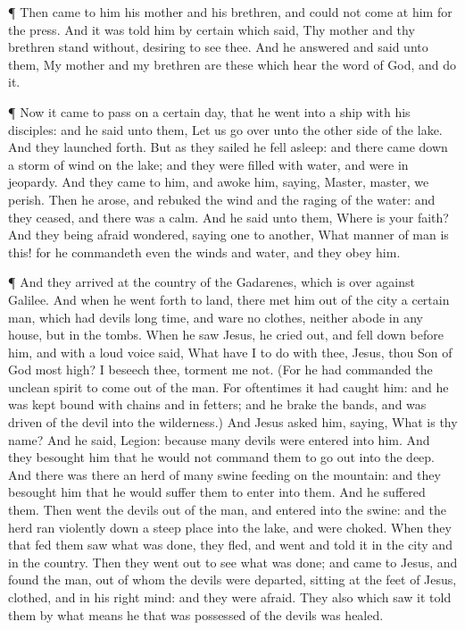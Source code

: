  ¶ Then came to him his mother and his brethren, and could
not come at him for the press.  And it was told him by
certain which said, Thy mother and thy brethren stand without, desiring
to see thee.  And he answered and said unto them, My mother
and my brethren are these which hear the word of God, and do it.

 ¶ Now it came to pass on a certain day, that he went into
a ship with his disciples: and he said unto them, Let us go over unto
the other side of the lake. And they launched forth.  But
as they sailed he fell asleep: and there came down a storm of wind on
the lake; and they were filled with water, and were in jeopardy.
 And they came to him, and awoke him, saying, Master,
master, we perish. Then he arose, and rebuked the wind and the raging of
the water: and they ceased, and there was a calm.  And he
said unto them, Where is your faith? And they being afraid wondered,
saying one to another, What manner of man is this! for he commandeth
even the winds and water, and they obey him.

 ¶ And they arrived at the country of the Gadarenes, which
is over against Galilee.  And when he went forth to land,
there met him out of the city a certain man, which had devils long time,
and ware no clothes, neither abode in any house, but in the tombs.
 When he saw Jesus, he cried out, and fell down before him,
and with a loud voice said, What have I to do with thee, Jesus, thou Son
of God most high? I beseech thee, torment me not.  (For he
had commanded the unclean spirit to come out of the man. For oftentimes
it had caught him: and he was kept bound with chains and in fetters; and
he brake the bands, and was driven of the devil into the wilderness.)
 And Jesus asked him, saying, What is thy name? And he
said, Legion: because many devils were entered into him. 
And they besought him that he would not command them to go out into the
deep.  And there was there an herd of many swine feeding on
the mountain: and they besought him that he would suffer them to enter
into them. And he suffered them.  Then went the devils out
of the man, and entered into the swine: and the herd ran violently down
a steep place into the lake, and were choked.  When they
that fed them saw what was done, they fled, and went and told it in the
city and in the country.  Then they went out to see what
was done; and came to Jesus, and found the man, out of whom the devils
were departed, sitting at the feet of Jesus, clothed, and in his right
mind: and they were afraid.  They also which saw it told
them by what means he that was possessed of the devils was healed.

